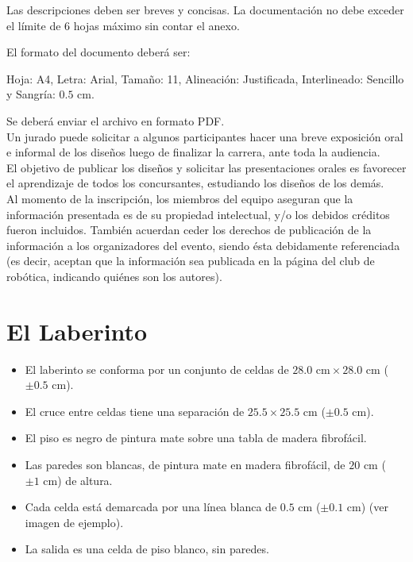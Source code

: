 \documentclass[a4paper,11pt]{article}
\newcommand{\cm}{\ensuremath{\mbox{~cm}}}
\begin{document}
Las descripciones deben ser breves y concisas. La documentación no debe exceder el límite de 6 hojas máximo sin contar el anexo. 

El formato del documento deberá ser: 

Hoja: A4, Letra: Arial, Tamaño: 11, Alineación: Justificada, Interlineado: Sencillo y Sangría: $0.5\cm$. 

Se deberá enviar el archivo en formato PDF.\\

Un jurado puede solicitar a algunos participantes hacer una breve exposición oral e informal de los diseños luego de finalizar la carrera, ante toda la audiencia.\\

El objetivo de publicar los diseños y solicitar las presentaciones orales es favorecer el aprendizaje de todos los concursantes, estudiando los diseños de los demás.\\

Al momento de la inscripción, los miembros del equipo aseguran que la información presentada es de su propiedad intelectual, y/o los debidos créditos fueron incluidos. También acuerdan ceder los derechos de publicación de la información a los organizadores del evento, siendo ésta debidamente referenciada (es decir, aceptan que la información sea publicada en la página del club de robótica, indicando quiénes son los autores).

\section*{El Laberinto}
\begin{itemize}
  \item El laberinto se conforma por un conjunto de celdas de $28.0\cm \times 28.0\cm$  ($\pm0.5\cm$).
  \item El cruce entre celdas tiene una separación de $25.5 \times 25.5\cm$ ($\pm0.5\cm$).
  \item El piso es negro de pintura mate sobre una tabla de madera fibrofácil.
  \item Las paredes son blancas, de pintura mate en madera fibrofácil, de $20\cm$ ($\pm1\cm$) de altura.
  \item Cada celda está demarcada por una línea blanca de $0.5\cm$ ($\pm0.1\cm$) (ver imagen de ejemplo).
  \item La salida es una celda de piso blanco, sin paredes.
\end{itemize}
\end{document}
